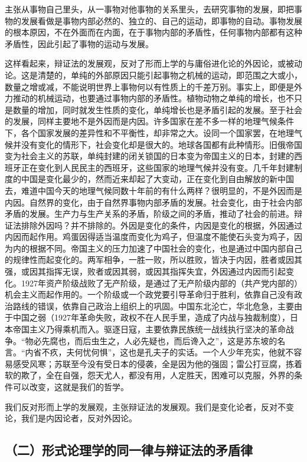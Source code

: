 主张从事物自己里头，从一事物对他事物的关系里头，去研究事物的发展，即把事物的发展看做是事物内部必然的、独立的、自己的运动，即事物的自动。事物发展的根本原因，不在外面而在内面，在于事物内部的矛盾性，任何事物内部都有这种矛盾性，因此引起了事物的运动与发展。

这样看起来，辩证法的发展观，反对了形而上学的与庸俗进化论的外因论，或被动论。这是清楚的，单纯的外部原因只能引起事物之机械的运动，即范围之大或小，数量之增或减，不能说明世界上事物何以有性质上的千差万别。事实上，即便是外力推动的机械运动，也要通过事物内部的矛盾性。植物动物之单纯的增长，也不只是数量的增加，同时就发生性质的变化，单纯增长也是矛盾引起的发展。至于社会的发展，同样主要地不是外因而是内因。许多国家在差不多一样的地理气候条件下，各个国家发展的差异性和不平衡性，却非常之大。设同一个国家罢，在地理气候并没有变化的情形下，社会变化却是很大的。地球各国都有此种情形。旧俄帝国变为社会主义的苏联，单纯封建的闭关锁国的日本变为帝国主义的日本，封建的西班牙正在变化到人民民主的西班牙，这些国家的地理气候并没有变。几千年封建制度的中国是变化最少的，然而近来却起了大变动，正在变化到自由解放的新中国去，难道中国今天的地理气候同数十年前的有什么两样？很明显的，不是外因而是内因。自然界的变化，由于自然界事物内部矛盾的发展。社会变化，由于社会内部矛盾的发展。生产力与生产关系的矛盾，阶级之间的矛盾，推动了社会的前进。辩证法排除外因吗？并不排除的。外因是变化的条件，内因是变化的根据，外因通过内因而起作用。鸡蛋因得适当温度而变化为鸡子，但温度不能使石头变为鸡子，因为内的根据不同。帝国主义的压力加速了中国社会的变化，也是通过中国内部自己的规律性而起变化的。两军相争，一胜一败，所以胜败，皆决于内因，胜者或因其强，或因其指挥无误，败者或因其弱，或因其指挥失宜，外因通过内因而引起变化。1927年资产阶级战败了无产阶级，是通过了无产阶级内部的（共产党内部的）机会主义而起作用的。一个阶级或一个政党要引导革命归于胜利，依靠自己没有政治路线的错误，依靠自己政治上组织上的巩固。中国东北沦亡，华北危急，主要由于中国之弱（1927年革命失败，政权不在人民手里，造成了内战与独裁制度），日本帝国主义乃得乘机而入。驱逐日寇，主要依靠民族统一战线执行坚决的革命战争。“物必先腐也，而后虫生之，人必先疑也，而后谗入之”，这是苏东坡的名言。“内省不疚，夫何忧何惧”，这也是孔夫子的实话。一个人少年充实，他就不容易感受风寒；苏联至今没有受日本的侵袭，全是因为他的强固；雷公打豆腐，拣着软的欺了，全在自强，怨天尤人，都没有用，人定胜天，困难可以克服，外界的条件可以改变，这就是我们的哲学。

我们反对形而上学的发展观，主张辩证法的发展观。我们是变化论者，反对不变论，我们是内因论者，反对外因论。

\subsection{（二）形式论理学的同一律与辩证法的矛盾律}

